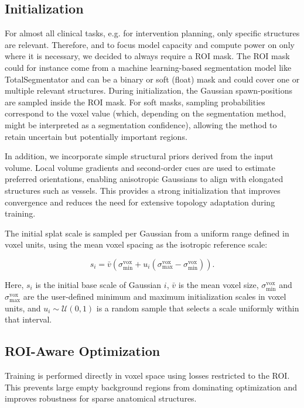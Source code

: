 \documentclass[runningheads]{llncs}
\begin{document}
\subsection{Initialization}

For almost all clinical tasks, e.g. for intervention planning, only specific structures are relevant. Therefore, and to focus model capacity and compute power on only where it is necessary, we decided to always require a ROI mask. The ROI mask could for instance come from a machine learning-based segmentation model like TotalSegmentator and can be a binary or soft (float) mask and could cover one or multiple relevant structures. During initialization, the Gaussian spawn-positions are sampled inside the ROI mask. For soft masks, sampling probabilities correspond to the voxel value (which, depending on the segmentation method, might be interpreted as a segmentation confidence), allowing the method to retain uncertain but potentially important regions.

In addition, we incorporate simple structural priors derived from the input volume. Local volume gradients and second-order cues are used to estimate preferred orientations, enabling anisotropic Gaussians to align with elongated structures such as vessels. This provides a strong initialization that improves convergence and reduces the need for extensive topology adaptation during training.

The initial splat scale is sampled per Gaussian from a uniform range defined in voxel units, using the mean voxel spacing as the isotropic reference scale:

\begin{equation}
s_i=\bar v\left(\sigma_{\min}^{\mathrm{vox}}+u_i\left(\sigma_{\max}^{\mathrm{vox}}-\sigma_{\min}^{\mathrm{vox}}\right)\right).
\end{equation}

Here, $s_i$ is the initial base scale of Gaussian $i$, $\bar v$ is the mean voxel size, $\sigma_{\min}^{\mathrm{vox}}$ and $\sigma_{\max}^{\mathrm{vox}}$ are the user-defined minimum and maximum initialization scales in voxel units, and $u_i \sim \mathcal{U}(0,1)$ is a random sample that selects a scale uniformly within that interval.

\subsection{ROI-Aware Optimization}
Training is performed directly in voxel space using losses restricted to the ROI. This prevents large empty background regions from dominating optimization and improves robustness for sparse anatomical structures.
\end{document}
